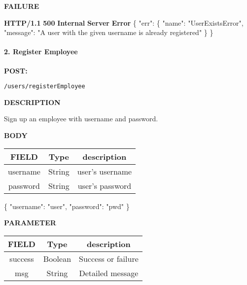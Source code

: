 \documentclass[
]{article}
\newenvironment{Shaded}{}{}
\newcommand{\DataTypeTok}[1]{\textcolor[rgb]{0.56,0.13,0.00}{#1}}
\newcommand{\ErrorTok}[1]{\textcolor[rgb]{1.00,0.00,0.00}{\textbf{#1}}}
\newcommand{\FunctionTok}[1]{\textcolor[rgb]{0.02,0.16,0.49}{#1}}
\newcommand{\StringTok}[1]{\textcolor[rgb]{0.25,0.44,0.63}{#1}}
\begin{document}
\textbf{FAILURE}

\begin{Shaded}
\begin{Highlighting}[]
\ErrorTok{HTTP/1.1} \ErrorTok{500} \ErrorTok{Internal} \ErrorTok{Server} \ErrorTok{Error}
\FunctionTok{\{}
    \DataTypeTok{"err"}\FunctionTok{:} \FunctionTok{\{}
        \DataTypeTok{"name"}\FunctionTok{:} \StringTok{"UserExistsError"}\FunctionTok{,}
        \DataTypeTok{"message"}\FunctionTok{:} \StringTok{"A user with the given username is already registered"}
    \FunctionTok{\}}
\FunctionTok{\}}
\end{Highlighting}
\end{Shaded}

\hypertarget{header-n59}{%
\paragraph{2. Register Employee}\label{header-n59}}

\textbf{POST:}

\begin{verbatim}
/users/registerEmployee
\end{verbatim}

\textbf{DESCRIPTION}

Sign up an employee with username and password.

\textbf{BODY}

\begin{longtable}[]{@{}ccc@{}}
\toprule
FIELD & Type & description\tabularnewline
\midrule
\endhead
username & String & user's username\tabularnewline
password & String & user's password\tabularnewline
\bottomrule
\end{longtable}

\begin{Shaded}
\begin{Highlighting}[]
\FunctionTok{\{}
    \DataTypeTok{"username"}\FunctionTok{:} \StringTok{"user"}\FunctionTok{,}
    \DataTypeTok{"password"}\FunctionTok{:} \StringTok{"pwd"}
\FunctionTok{\}}
\end{Highlighting}
\end{Shaded}

\textbf{PARAMETER}

\begin{longtable}[]{@{}ccc@{}}
\toprule
FIELD & Type & description\tabularnewline
\midrule
\endhead
success & Boolean & Success or failure\tabularnewline
msg & String & Detailed message\tabularnewline
\bottomrule
\end{longtable}
\end{document}
